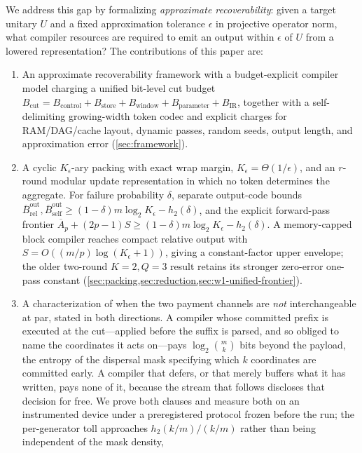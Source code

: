 \documentclass[a4paper,twocolumn,10pt,unpublished]{quantumarticle}
\begin{document}
We address this gap by formalizing \emph{approximate recoverability}:
given a target unitary $U$ and a fixed approximation tolerance $\epsilon$
in projective operator norm, what compiler resources are required to emit
an output within $\epsilon$ of $U$ from a lowered representation? The
contributions of this paper are:
\begin{enumerate}[leftmargin=1.5em]
    \item An approximate recoverability framework with a budget-explicit
    compiler model charging a unified bit-level cut budget
    $B_{\mathrm{cut}}=B_{\mathrm{control}}+B_{\mathrm{store}}+
    B_{\mathrm{window}}+B_{\mathrm{parameter}}+B_{\mathrm{IR}}$, together
    with a self-delimiting growing-width token codec and explicit charges
    for RAM/DAG/cache layout, dynamic passes, random seeds, output length,
    and approximation error
    (\cref{sec:framework}).
    \item A cyclic $K_\epsilon$-ary packing with exact wrap margin,
    $K_\epsilon=\Theta(1/\epsilon)$, and an $r$-round modular update
    representation in which no token determines the aggregate.  For
    failure probability $\delta$, separate output-code bounds
    $\overline B_{\mathrm{rel}}^{\mathrm{out}},
    \overline B_{\mathrm{self}}^{\mathrm{out}}
    \geq(1-\delta)m\log_2K_\epsilon-h_2(\delta)$, and the explicit
    forward-pass frontier
    $\overline A_p+(2p-1)S\geq
    (1-\delta)m\log_2K_\epsilon-h_2(\delta)$.  A memory-capped block
    compiler reaches compact relative output with
    $S=O((m/p)\log(K_\epsilon+1))$, giving a constant-factor upper
    envelope; the older two-round $K=2,Q=3$ result retains its stronger
    zero-error one-pass constant
    (\cref{sec:packing,sec:reduction,sec:w1-unified-frontier}).
    \item A characterization of when the two payment channels are
    \emph{not} interchangeable at par, stated in both directions.  A
    compiler whose committed prefix is executed at the cut---applied
    before the suffix is parsed, and so obliged to name the coordinates
    it acts on---pays $\log_2\binom{m}{k}$ bits beyond the payload, the
    entropy of the dispersal mask specifying which $k$ coordinates are committed
    early.  A compiler that defers, or that merely buffers what it has
    written, pays none of it, because the stream that follows discloses
    that decision for free.  We prove both clauses and measure both on
    an instrumented device under a preregistered protocol frozen before
    the run; the per-generator toll approaches
    $h_2(k/m)/(k/m)$ rather than being independent of the mask density,

\end{enumerate}
\end{document}
